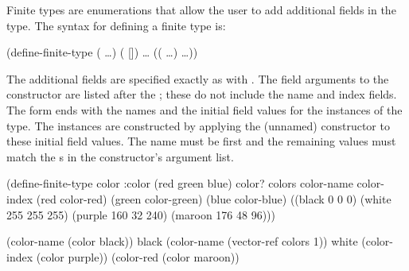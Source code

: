 Finite types are enumerations that allow the user to add additional
 fields in the type.
The syntax for defining a finite type is:
\begin{example}
(define-finite-type  
  ( \ldots)
  (  [])
  \ldots
  ((  \ldots)
   \ldots))
\end{example}
The additional fields are specified exactly as with .
The field arguments to the constructor are listed after the ;
 these do not include the name and index fields.
The form ends with the names and the initial field values for
 the instances of the type.
The instances are constructed by applying the (unnamed) constructor to
 these initial field values.
The name must be first and 
 the remaining values must match the s in the constructor's
 argument list.


\begin{example}
(define-finite-type color :color
  (red green blue)
  color?
  colors
  color-name
  color-index
  (red   color-red)
  (green color-green)
  (blue  color-blue)
  ((black    0   0   0)
   (white  255 255 255)
   (purple 160  32 240)
   (maroon 176  48  96)))

(color-name (color black))         \evalsto black
(color-name (vector-ref colors 1)) \evalsto white
(color-index (color purple))       
(color-red (color maroon))         
\end{example}

